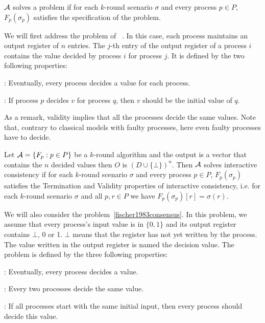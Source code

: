 {{ $\cal A$ solves a problem 
 if for each $k$-round scenario $\sigma$ and every process $p
\in P$,  $F_{p} ( \sigma_{p} )$ satisfies the specification of the
problem.




\vspace{2em}
We will first address the problem of {}~\cite{fischer1983consensus}. 
In this case, each process maintains an output register of $n$ entries. 
The $j$-th entry of the output register of a process $i$ contains the value decided by process $i$ for process $j$.
It is defined by the  two following properties:
\begin{itemizedot}
  \item {}: Eventually, every process decides a value for
  each process.
  
  \item {}: If process $p$ decides $v$ for process $q$, then
  $v$ should be the initial value of $q$.
\end{itemizedot}
As a remark, validity implies that all the processes decide the same
values.
Note that, contrary to classical models with faulty processes, here
even faulty processes have to decide. 

Let ${\cal A}= \{
F_{p} :p \in P \}$ be a $k$-round algorithm and the output is a vector that contains the  $n$ decided values then  $O$ is $(D\cup \{\bot\})^n$.
Then $\cal A$ solves  interactive
consistency if for each $k$-round scenario $\sigma$ and 
every process $p
\in P$,  $F_{p} ( \sigma_{p} )$ satisfies the Termination and Validity properties of interactive consistency, i.e.
for each $k$-round scenario $\sigma$ and all $p,r
\in P$ we have $F_{p} ( \sigma_{p} )[r] = \sigma ( r )$.


\vspace{1em}
We will also consider the {} problem~\ref{fischer1983consensus}. 
In this problem, we assume that every process's input value is in $\{0,1\}$
and its output register contains $\bot$, 0 or 1. $\bot$ means that the
register has not yet written by the process. 
The value written in the output register is named the decision value.
The  {} problem is defined by the three
following properties: 
\begin{itemizedot}
  \item {}: Eventually, every process decides a value.
  \item {}: Every two processes decide the same value.
  \item {}: If  all processes start with the same
    initial input, then every process should decide this value. 
\end{itemizedot}


}}
